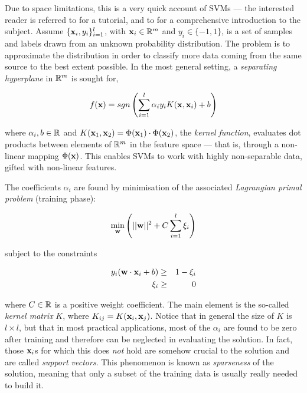 Due to space limitations, this is a very quick account of SVMs --- the
interested reader is referred to \cite{Burges98,SmolaTut2004} for a
tutorial, and to \cite{Cristianini00} for a comprehensive introduction
to the subject. Assume $\{\mathbf{x}_i,y_i\}_{i=1}^l$, with $\mathbf{x}_i \in \mathbb{R}^m$
and $y_i \in \{-1,1\}$, is a set of samples and labels drawn from an
unknown probability distribution. The problem is to approximate the
distribution in order to classify more data coming from the same
source to the best extent possible. In the most general setting, a
\emph{separating hyperplane} in $\mathbb{R}^m$ is sought for,

\begin{equation} \label{eqn:sol}
  f(\mathbf{x}) = sgn \left( \sum_{i=1}^l \alpha_i y_i K(\mathbf{x},\mathbf{x}_i) + b \right)
\end{equation}

\noindent where $\alpha_i,b \in \mathbb{R}$ and $K(\mathbf{x}_1,\mathbf{x}_2) = \Phi(\mathbf{x}_1)
\cdot \Phi(\mathbf{x}_2)$, the \emph{kernel function}, evaluates dot
products between elements of $\mathbb{R}^m$ in the feature space --- that is,
through a non-linear mapping $\Phi(\mathbf{x})$. This enables SVMs to work
with highly non-separable data, gifted with non-linear features.

The coefficients $\alpha_i$ are found by minimisation of the
associated \emph{Lagrangian primal problem} (training phase):

\begin{equation} \label{eqn:svm_primal}
  \min_{\mathbf{w}} \left( ||\mathbf{w}||^2 + C \sum_{i=1}^l \xi_i \right)
\end{equation}

\noindent subject to the constraints

\begin{eqnarray} \label{eqn:svm_constr}
  y_i (\mathbf{w}\cdot\mathbf{x}_i + b) & \geq & 1-\xi_i \\
                    \xi_i & \geq & 0 \nonumber
\end{eqnarray}

\noindent where $C \in \mathbb{R}$ is a positive weight coefficient. The main
element is the so-called \emph{kernel matrix} $K$, where $K_{ij} =
K(\mathbf{x}_i,\mathbf{x}_j)$. Notice that in general the size of $K$ is $l \times
l$, but that in most practical applications, most of the $\alpha_i$
are found to be zero after training and therefore can be neglected in
evaluating the solution. In fact, those $\mathbf{x}_i$s for which this does
\emph{not} hold are somehow crucial to the solution and are called
\emph{support vectors}. This phenomenon is known as \emph{sparseness}
of the solution, meaning that only a subset of the training data is
usually really needed to build it.
